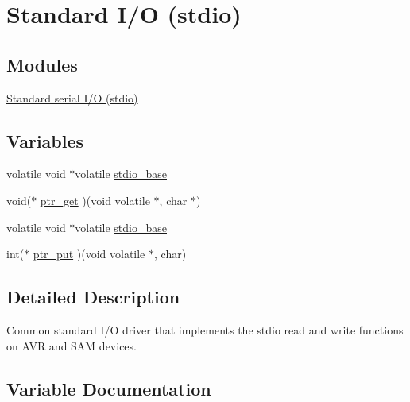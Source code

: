 \hypertarget{group__group__common__utils__stdio}{}\section{Standard I/\+O (stdio)}
\label{group__group__common__utils__stdio}
\subsection*{Modules}
\begin{DoxyCompactItemize}
\item 
\hyperlink{group__group__common__utils__stdio__stdio__serial}{Standard serial I/\+O (stdio)}
\end{DoxyCompactItemize}
\subsection*{Variables}
\begin{DoxyCompactItemize}
\item 
volatile void $\ast$volatile \hyperlink{group__group__common__utils__stdio_gad4163ee0eaa09db3b42c367fd768e737}{stdio\+\_\+base}
\item 
void($\ast$ \hyperlink{group__group__common__utils__stdio_ga7332be07af3c0ab09d41a9b0b97efbe8}{ptr\+\_\+get} )(void volatile $\ast$, char $\ast$)
\item 
volatile void $\ast$volatile \hyperlink{group__group__common__utils__stdio_gad4163ee0eaa09db3b42c367fd768e737}{stdio\+\_\+base}
\item 
int($\ast$ \hyperlink{group__group__common__utils__stdio_gab88750c764f1e24b95134201373aba70}{ptr\+\_\+put} )(void volatile $\ast$, char)
\end{DoxyCompactItemize}


\subsection{Detailed Description}
Common standard I/\+O driver that implements the stdio read and write functions on A\+V\+R and S\+A\+M devices. 

\subsection{Variable Documentation}
\hypertarget{group__group__common__utils__stdio_ga7332be07af3c0ab09d41a9b0b97efbe8}{}
